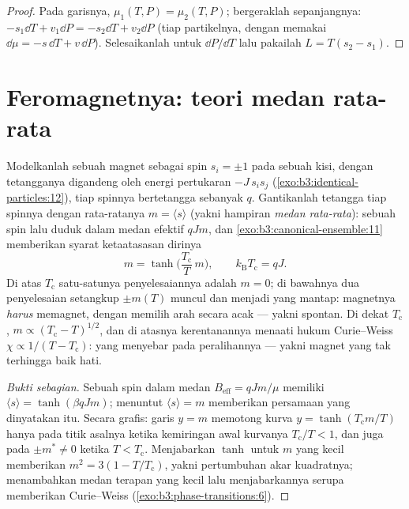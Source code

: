 \begin{proof}
Pada garisnya, $\mu_1(T, P) = \mu_2(T, P)$; bergeraklah sepanjangnya:
$-s_1\dd T + v_1\dd P = -s_2\dd T + v_2\dd P$ (tiap partikelnya, dengan
memakai $\dd\mu = -s\,\dd T + v\,\dd P$). Selesaikanlah untuk $\dd P/\dd T$
lalu pakailah $L = T(s_2 - s_1)$.
\end{proof}

\section{Feromagnetnya: teori medan rata-rata}

\begin{theorem}\label{thm:b3:phase-transitions:meanfield}
Modelkanlah sebuah magnet sebagai spin $s_i = \pm1$ pada sebuah kisi,
dengan tetangganya digandeng oleh energi pertukaran $-J\,s_is_j$
(\cref{exo:b3:identical-particles:12}), tiap spinnya bertetangga
sebanyak $q$. Gantikanlah tetangga tiap spinnya dengan rata-ratanya $m =
\langle s\rangle$ (yakni hampiran \emph{medan rata-rata}): sebuah spin
lalu duduk dalam medan efektif $qJm$, dan
\cref{exo:b3:canonical-ensemble:11} memberikan syarat
ketaatasasan dirinya
\[
m = \tanh\!\Big(\frac{T_{\text{c}}}{T}\,m\Big) , \qquad
k_{\text{B}}T_{\text{c}} = qJ .
\]
Di atas $T_{\text{c}}$ satu-satunya penyelesaiannya adalah $m = 0$; di
bawahnya dua penyelesaian setangkup $\pm m(T)$ muncul dan menjadi yang
mantap: magnetnya \emph{harus} memagnet, dengan memilih arah secara acak
--- yakni  spontan. Di dekat $T_{\text{c}}$, $m \propto
(T_{\text{c}} - T)^{1/2}$, dan di atasnya kerentanannya menaati
hukum Curie--Weiss $\chi \propto 1/(T - T_{\text{c}})$:
yang menyebar pada peralihannya --- yakni magnet yang tak terhingga baik hati.
\end{theorem}

\begin{proof}[Bukti sebagian]
Sebuah spin dalam medan $B_{\text{eff}} = qJm/\mu$ memiliki $\langle s\rangle =
\tanh(\beta qJm)$; menuntut $\langle s\rangle = m$ memberikan persamaan
yang dinyatakan itu. Secara grafis: garis $y = m$ memotong kurva $y =
\tanh(T_{\text{c}}m/T)$ hanya pada titik asalnya ketika kemiringan awal
kurvanya $T_{\text{c}}/T < 1$, dan juga pada $\pm m^* \neq 0$ ketika
$T < T_{\text{c}}$. Menjabarkan $\tanh$ untuk $m$ yang kecil
memberikan $m^2 = 3(1 - T/T_{\text{c}})$, yakni pertumbuhan akar
kuadratnya; menambahkan medan terapan yang kecil lalu menjabarkannya
serupa memberikan Curie--Weiss (\cref{exo:b3:phase-transitions:6}).
\end{proof}

